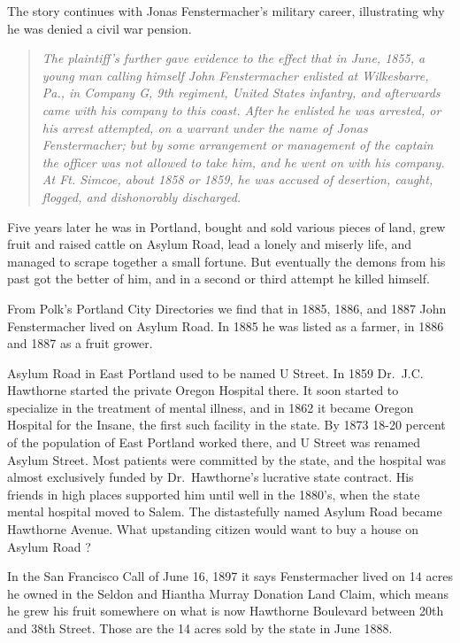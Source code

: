 \documentclass[
  12pt,
]{book}
\begin{document}
The story continues with Jonas Fenstermacher's military career, illustrating why he was denied a civil war pension.

\begin{quote}
\emph{The plaintiff's further gave evidence to the effect that in June, 1855, a young man calling himself John Fenstermacher enlisted at Wilkesbarre, Pa., in Company G, 9th regiment, United States infantry, and afterwards came with his company to this coast. After he enlisted he was arrested, or his arrest attempted, on a warrant under the name of Jonas Fenstermacher; but by some arrangement or management of the captain the officer was not allowed to take him, and he went on with his company. At Ft. Simcoe, about 1858 or 1859, he was accused of desertion, caught, flogged, and dishonorably discharged.}
\end{quote}

Five years later he was in Portland, bought and sold various pieces of land, grew fruit and raised cattle on Asylum Road, lead a lonely and miserly life, and managed to scrape together a small fortune. But eventually the demons from his past got the better of him, and in a second or third attempt he killed himself.

From Polk's Portland City Directories we find that in 1885, 1886, and 1887 John Fenstermacher lived on Asylum Road. In 1885 he was listed as a farmer, in 1886 and 1887 as a fruit grower.

Asylum Road in East Portland used to be named U Street. In 1859 Dr.~J.C. Hawthorne started the private Oregon Hospital there. It soon started to specialize in the treatment of mental illness, and in 1862 it became Oregon Hospital for the Insane, the first such facility in the state. By 1873 18-20 percent of the population of East Portland worked there, and U Street was renamed Asylum Street. Most patients were committed by the state, and the hospital was almost exclusively funded by Dr.~Hawthorne's lucrative state contract. His friends in high places supported him until well in the 1880's, when the state mental hospital moved to Salem. The distastefully named Asylum Road became Hawthorne Avenue. What upstanding citizen would want to buy a house on Asylum Road ?

In the San Francisco Call of June 16, 1897 it says Fenstermacher lived on 14 acres he owned in the Seldon and Hiantha Murray Donation Land Claim, which means he grew his fruit somewhere on what is now Hawthorne Boulevard between 20th and 38th Street. Those are the 14 acres sold by the state in June 1888.
\end{document}
